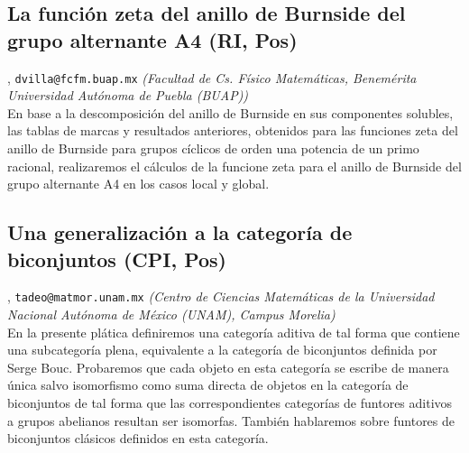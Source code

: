 \subsection{\sffamily La funci\'on zeta del anillo de Burnside del grupo alternante A4 {\footnotesize (RI, Pos)}} \label{reg-707} 
, {\tt dvilla@fcfm.buap.mx}  {\slshape (Facultad de Cs. F\'isico Matem\'aticas, Benem\'erita Universidad Aut\'onoma de Puebla (BUAP))}\\
          \noindent  En base a la descomposici\'on del anillo de Burnside en sus componentes solubles, las tablas de marcas y resultados anteriores, obtenidos para las funciones zeta del anillo de Burnside para grupos c\'iclicos de orden una potencia de un primo racional, realizaremos el c\'alculos de la funcione zeta para el anillo de Burnside del grupo alternante A4 en los casos local y global.
\subsection{\sffamily Una generalizaci\'on a la categor\'ia de biconjuntos {\footnotesize (CPI, Pos)}} \label{reg-510} 
, {\tt tadeo@matmor.unam.mx}  {\slshape (Centro de Ciencias Matem\'aticas de la Universidad Nacional Aut\'onoma de M\'exico (UNAM), Campus Morelia)}\\
          \noindent En la presente pl\'atica definiremos una categor\'ia  aditiva de tal forma que contiene una subcategor\'ia plena, equivalente a la categor\'ia de biconjuntos definida por Serge Bouc. Probaremos que cada objeto en esta categor\'ia se escribe de manera \'unica salvo isomorfismo como suma directa de objetos en la categor\'ia de biconjuntos de tal forma que las correspondientes categor\'ias de funtores aditivos a grupos abelianos resultan ser isomorfas. Tambi\'en hablaremos sobre funtores de biconjuntos cl\'asicos definidos en esta categor\'ia.
